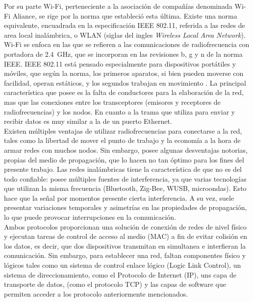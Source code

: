 Por su parte Wi-Fi, perteneciente a la asociación de compañías denominada Wi-Fi Aliance, se rige por la norma que estableció esta última. Existe una norma equivalente, encuadrada en la especificación IEEE 802.11, referida a las redes de area local inalámbrica, o WLAN (siglas del ingles {\it Wireless Local Area Network}). Wi-Fi se enfoca en las que se refieren a las comunicaciones de radiofrecuencia con portadora de \SI{2,4}{\giga\hertz}, que se incorporan en las revisiones b, g y n de la norma IEEE. IEEE 802.11 está pensado especialmente para dispositivos portátiles y móviles, que según la norma, los primeros aparatos, si bien pueden moverse con facilidad, operan estáticos, y los segundos trabajan en movimiento \cite{wifi2013}. La principal característica que posee es la falta de conductores para la elaboración de la red, mas que las conexiones entre los transceptores (emisores y receptores de radiofrecuencias) y los nodos. En cuanto a la trama que utiliza para enviar y recibir datos es muy similar a la de un puerto Ethernet.\\

Existen múltiples ventajas de utilizar radiofrecuencias para conectarse a la red, tales como la libertad de mover el punto de trabajo y la economía a la hora de armar redes con muchos nodos. Sin embargo, posee algunas desventajas notorias, propias del medio de propagación, que lo hacen no tan óptimo para los fines del presente trabajo. Las redes inalámbricas tiene la característica de que no es del todo confiable: posee múltiples fuentes de interferencia, ya que varias tecnologías que utilizan la misma frecuencia (Bluetooth, Zig-Bee, WUSB, microondas). Esto hace que la señal por momentos presente cierta interferencia. A su vez, suele presentar variaciones temporales y asimetrías en las propiedades de propagación, lo que puede provocar interrupciones en la comunicación.\\

Ambos protocolos proporcionan una solución de conexión de redes de nivel físico y ejecutan tareas de control de acceso al medio (MAC) a fin de evitar colisión en los datos, es decir, que dos dispositivos transmitan en simultanea e interfieran la comunicación.
Sin embargo, para establecer una red, faltan componentes físico y lógicos tales como un sistema de control enlace lógico (Logic Link Control), un sistema de direccionamiento, como el Protocolo de Internet (IP), uns capa de transporte de datos, (como el protocolo TCP) y las capas de software que permiten acceder a los protocolo anteriormente mencionados.\\

